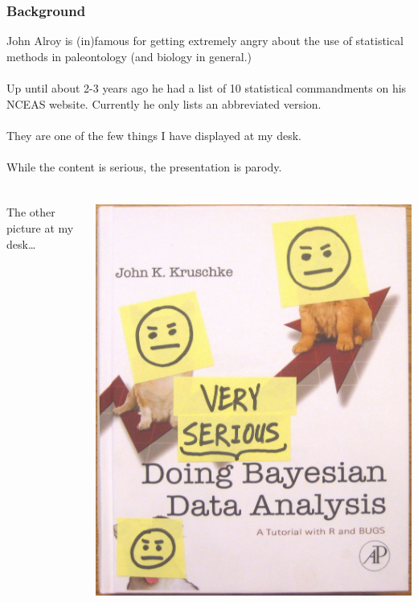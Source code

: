\documentclass{beamer}\usepackage{graphicx, color}
\begin{document}
\begin{frame}
\frametitle{Background}
John Alroy is (in)famous for getting extremely angry about the use of statistical methods in paleontology (and biology in general.)
\\~\\
Up until about 2-3 years ago he had a list of 10 statistical commandments on his NCEAS website. 
Currently he only lists an abbreviated version. %
\\~\\
They are one of the few things I have displayed at my desk.
\\~\\
While the content is serious, the presentation is parody.
\end{frame}



\begin{frame}
\frametitle{}
\begin{columns}
\begin{column}{0.5\textwidth}
The other picture at my desk\dots
\end{column}
\begin{column}{0.5\textwidth}
\includegraphics[width = \textwidth]{bayesian}
\end{column}
\end{columns}
\end{frame}
\end{document}
